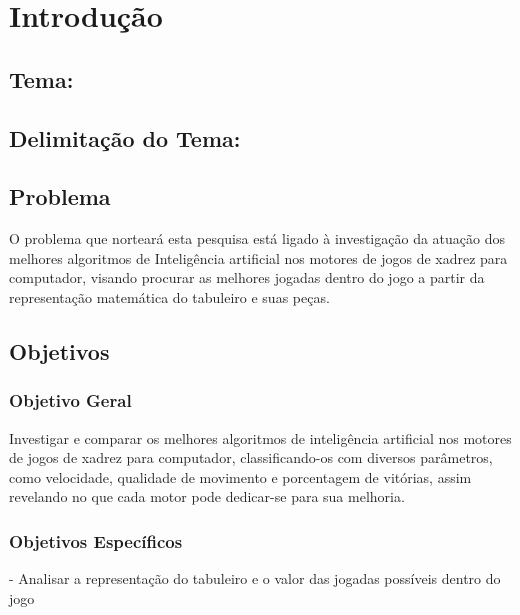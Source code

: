 

\chapter{Introdução}
\section[Tema]{Tema: {}}

\section[Delimitação do Tema]{Delimitação do Tema: {}}

\section{Problema}

O problema que norteará esta pesquisa está ligado à investigação da atuação dos melhores algoritmos de Inteligência artificial
nos motores de jogos de xadrez para computador, visando procurar as melhores jogadas dentro do jogo a partir da representação
matemática do tabuleiro e suas peças.

\section{Objetivos}

\subsection{Objetivo Geral}
Investigar e comparar os melhores algoritmos de inteligência artificial nos motores de jogos de xadrez para computador,
classificando-os com diversos parâmetros, como velocidade, qualidade de movimento e porcentagem de vitórias, assim revelando
no que cada motor pode dedicar-se para sua melhoria.
\subsection{Objetivos Específicos}
- Analisar a representação do tabuleiro e o valor das jogadas possíveis dentro do jogo

